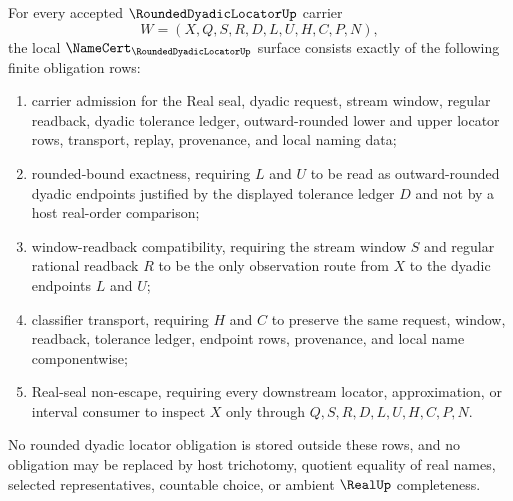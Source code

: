 \begin{theorem}
\label{thm:rounded-dyadic-locator-namecert-obligations}
For every accepted $\RoundedDyadicLocatorUp$ carrier
$$
W=(X,Q,S,R,D,L,U,H,C,P,N),
$$
the local $\NameCert_{\RoundedDyadicLocatorUp}$ surface consists exactly of the following finite obligation rows:
\begin{enumerate}
\item carrier admission for the Real seal, dyadic request, stream window, regular readback, dyadic tolerance ledger, outward-rounded lower and upper locator rows, transport, replay, provenance, and local naming data;
\item rounded-bound exactness, requiring $L$ and $U$ to be read as outward-rounded dyadic endpoints justified by the displayed tolerance ledger $D$ and not by a host real-order comparison;
\item window-readback compatibility, requiring the stream window $S$ and regular rational readback $R$ to be the only observation route from $X$ to the dyadic endpoints $L$ and $U$;
\item classifier transport, requiring $H$ and $C$ to preserve the same request, window, readback, tolerance ledger, endpoint rows, provenance, and local name componentwise;
\item Real-seal non-escape, requiring every downstream locator, approximation, or interval consumer to inspect $X$ only through $Q,S,R,D,L,U,H,C,P,N$.
\end{enumerate}
No rounded dyadic locator obligation is stored outside these rows, and no obligation may be replaced by host trichotomy, quotient equality of real names, selected representatives, countable choice, or ambient $\RealUp$ completeness.
\end{theorem}
